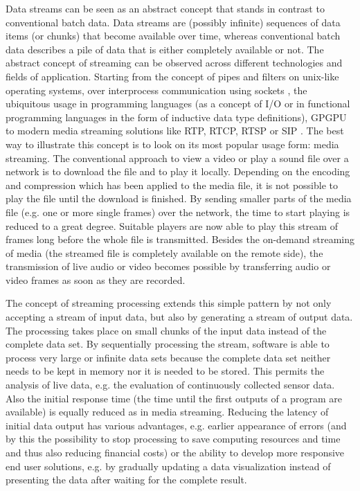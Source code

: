 	Data streams can be seen as an abstract concept that stands in contrast to conventional batch data. Data streams are (possibly infinite) sequences of data items (or chunks) that become available over time, whereas conventional batch data describes a pile of data that is either completely available or not. The abstract concept of streaming can be observed across different technologies and fields of application. Starting from the concept of pipes and filters on unix-like operating systems, over interprocess communication using sockets \citep[either local or over a network,][]{buschmann1996pattern}, the ubiquitous usage in programming languages (as a concept of I/O or in functional programming languages in the form of inductive data type definitions), \ac{GPGPU} to modern media streaming solutions like RTP, RTCP, RTSP \citep{ietf:rfc3550,ietf:rfc2326} or SIP \citep{ietf:rfc3261}. The best way to illustrate this concept is to look on its most popular usage form: media streaming. The conventional approach to view a video or play a sound file over a network is to download the file and to play it locally. Depending on the encoding and compression which has been applied to the media file, it is not possible to play the file until the download is finished. By sending smaller parts of the media file (e.g. one or more single frames) over the network, the time to start playing is reduced to a great degree. Suitable players are now able to play this stream of frames long before the whole file is transmitted. Besides the on-demand streaming of media (the streamed file is completely available on the remote side), the transmission of live audio or video becomes possible by transferring audio or video frames as soon as they are recorded.

	The concept of streaming processing extends this simple pattern by not only accepting a stream of input data, but also by generating a stream of output data. The processing takes place on small chunks of the input data instead of the complete data set. By sequentially processing the stream, software is able to process very large or infinite data sets because the complete data set neither needs to be kept in memory nor it is needed to be stored. This permits the analysis of live data, e.g. the evaluation of continuously collected sensor data. Also the initial response time (the time until the first outputs of a program are available) is equally reduced as in media streaming. Reducing the latency of initial data output has various advantages, e.g. earlier appearance of errors (and by this the possibility to stop processing to save computing resources and time and thus also reducing financial costs) or the ability to develop more responsive end user solutions, e.g. by gradually updating a data visualization instead of presenting the data after waiting for the complete result.

